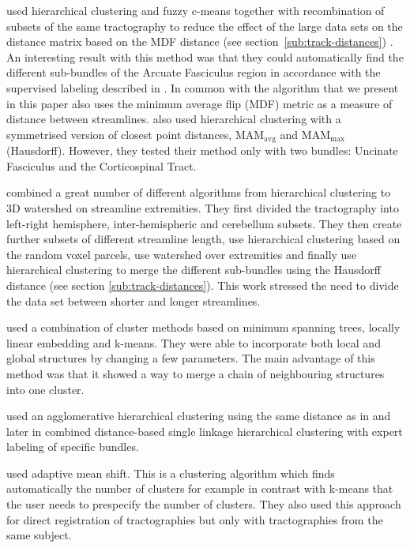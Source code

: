 \documentclass{bioinfo}
\begin{document}
\citet{Visser2010} used hierarchical clustering and fuzzy c-means
together with recombination of subsets of the same tractography to
reduce the effect of the large data sets on the distance matrix based on
the MDF distance (see section~\ref{sub:track-distances})
\citep{EGMB10}. An interesting result with this method was that they
could automatically find the different sub-bundles of the Arcuate
Fasciculus region in accordance with the supervised labeling described
in \citet{catani2005perisylvian}. In common with \citet{Visser2010} 
the algorithm that we present in this
paper also uses the minimum average flip (MDF) metric as a measure of
distance between streamlines. \citet{gerig2004analysis} also used
hierarchical clustering with a symmetrised version of closest point
distances, $\mathrm{MA}\mathrm{M}_{\mathrm{avg}}$ and
$\mathrm{MA}\mathrm{M}_{\mathrm{max}}$ (Hausdorff). However, they tested
their method only with two bundles: Uncinate Fasciculus and the
Corticospinal Tract.

\citet{Guevara2010} combined a great number of different algorithms from
hierarchical clustering to 3D watershed on streamline extremities.  They
first divided the tractography into left-right hemisphere,
inter-hemispheric and cerebellum subsets. They then create further
subsets of different streamline length, use hierarchical clustering
based on the random voxel parcels, use watershed over extremities and
finally use hierarchical clustering to merge the different sub-bundles
using the Hausdorff distance (see section
\ref{sub:track-distances}). This work stressed the need to divide the
data set between shorter and longer streamlines.

\citet{Tsai2007} used a combination of cluster methods based on minimum
spanning trees, locally linear embedding and k-means.  They were able to
incorporate both local and global structures by changing a few
parameters. The main advantage of this method was that it showed a way
to merge a chain of neighbouring structures into one cluster.

\citet*{zhang2005dti} used an agglomerative hierarchical clustering
using the same distance as in \citet{zhang2003visualizing} and later in
\citet{zhang2008identifying} combined distance-based single linkage
hierarchical clustering with expert labeling of specific
bundles. 

\citet{zvitia2008adaptive, Zvitia2010} used adaptive mean shift. This is
a clustering algorithm which finds automatically the number of clusters
for example in contrast with k-means that the user needs to prespecify
the number of clusters.  They also used this approach for direct
registration of tractographies but only with tractographies from the
same subject.
\end{document}
